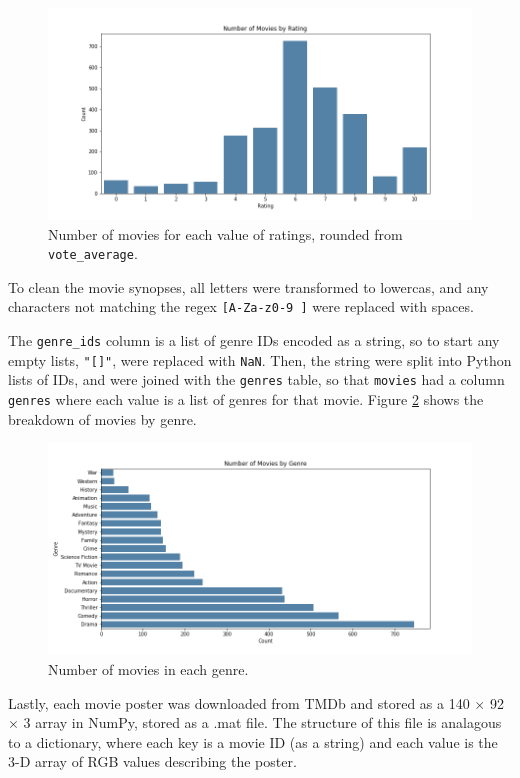 \documentclass[12pt, oneside]{article}   	%
\begin{document}
\begin{figure}%
\includegraphics[width=\textwidth]{rating_barplot}
\caption{\label{fig:rating_barplot}Number of movies for each value of ratings, rounded from \texttt{vote\_average}.}
\end{figure}

To clean the movie synopses, all letters were transformed to lowercas, and any characters not matching the regex \texttt{[A-Za-z0-9 ]} were replaced with spaces.

The \texttt{genre\_ids} column is a list of genre IDs encoded as a string, so to start any empty lists, \texttt{"[]"}, were replaced with \texttt{NaN}. Then, the string were split into Python lists of IDs, and were joined with the \texttt{genres} table, so that \texttt{movies} had a column \texttt{genres} where each value is a list of genres for that movie. Figure \ref{fig:genre_barplot} shows the breakdown of movies by genre.

\begin{figure}%
\includegraphics[width=\textwidth]{genre_barplot}
\caption{\label{fig:genre_barplot}Number of movies in each genre.}
\end{figure}

Lastly, each movie poster was downloaded from TMDb and stored as a 140 $\times$ 92 $\times$ 3 array in NumPy, stored as a .mat file. The structure of this file is analagous to a dictionary, where each key is a movie ID (as a string) and each value is the 3-D array of RGB values describing the poster.
\end{document}
